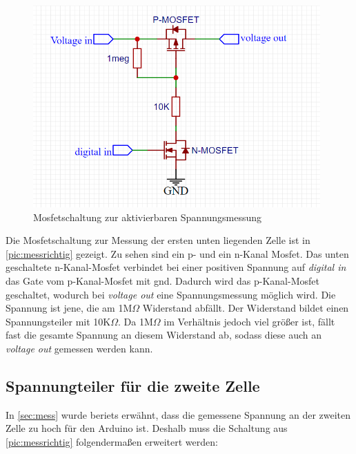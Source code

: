 \begin{figure}[h]
	\begin{center}
		\includegraphics[width=11cm]{messRichtig.PNG}
		\caption{\label{pic:messrichtig} Mosfetschaltung zur aktivierbaren Spannungsmessung}
	\end{center}
\end{figure}

Die Mosfetschaltung zur Messung der ersten unten liegenden Zelle ist in \autoref{pic:messrichtig} gezeigt.
Zu sehen sind ein p- und ein n-Kanal Mosfet. Das unten geschaltete n-Kanal-Mosfet verbindet bei einer positiven Spannung auf \textit{digital in} das Gate vom p-Kanal-Mosfet mit \gls{gnd}. Dadurch wird das p-Kanal-Mosfet geschaltet, wodurch bei \textit{voltage out} eine Spannungsmessung möglich wird. Die Spannung ist jene, die am 1M$\Omega$ Widerstand abfällt. Der Widerstand bildet einen Spannungsteiler mit 10K$\Omega$. Da 1M$\Omega$ im Verhältnis jedoch viel größer ist, fällt fast die gesamte Spannung an diesem Widerstand ab, sodass diese auch an \textit{voltage out} gemessen werden kann.

\subsection{Spannungteiler für die zweite Zelle}
In \autoref{sec:mess} wurde beriets erwähnt, dass die gemessene Spannung an der zweiten Zelle zu hoch für den Arduino ist. Deshalb muss die Schaltung aus \autoref{pic:messrichtig} folgendermaßen erweitert werden:

